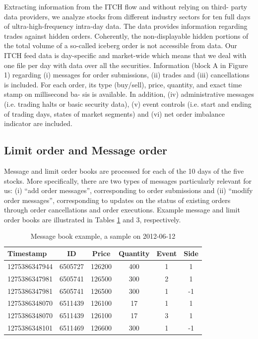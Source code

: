  Extracting information from the ITCH flow and without relying on third-
 party data providers, we analyze stocks from different industry sectors for ten
 full days of ultra-high-frequency intra-day data. The data provides information regarding trades against hidden orders. Coherently, the non-displayable
 hidden portions of the total volume of a so-called iceberg order is not accessible from data. Our ITCH feed data is day-specific and market-wide
 which means that we deal with one file per day with data over all the securities. Information (block A in Figure 1) regarding (i) messages for order
 submissions, (ii) trades and (iii) cancellations is included. For each order,
 its type (buy/sell), price, quantity, and exact time stamp on millisecond ba-
 sis is available. In addition, (iv) administrative messages (i.e. trading halts
 or basic security data), (v) event controls (i.e. start and ending of trading
 days, states of market segments) and (vi) net order imbalance indicator are
 included.
\subsection{Limit order and Message order}
Message and limit order books are processed for each of the 10 days of the
five stocks. More specifically, there are two types of messages particularly
relevant for us: (i) “add order messages”, corresponding to order submissions
and (ii) “modify order messages”, corresponding to updates on the status of
existing orders through order cancellations and order executions. Example
message and limit order books are illustrated in Tables \ref{tab:message} and 3, respectively.
\begin{table}
	\caption{Message book example, a sample on 2012-06-12}
	\label{tab:message}
	\begin{center} 
		\begin{tabular}{|l|c|c|c|c|c|}
			\hline
			Timestamp & ID  & Price & Quantity & Event & Side\\[5pt]
			 \hline
		1275386347944& 6505727 &  126200& 400& 1 & 1\\
		1275386347981& 6505741& 126500& 300& 2 & 1\\
		1275386347981&	6505741&	126500& 300 & 1&-1\\
		1275386348070& 6511439& 126100& 17& 1 & 1 \\
		1275386348070& 6511439& 126100& 17& 3 & 1\\
		1275386348101& 6511469& 126600& 300 & 1 &-1\\
			\hline 
		\end{tabular}
	\end{center}
\end{table}
 
